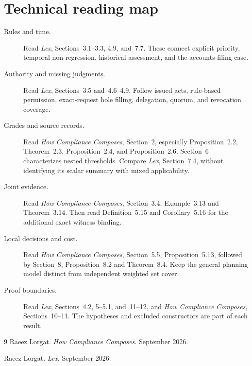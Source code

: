 \documentclass{momentum}
\begin{document}
\section{Technical reading map}

\begin{description}
\item[Rules and time.] Read \emph{Lex}, Sections~3.1--3.3, 4.9, and~7.7. These connect explicit priority, temporal non-regression, historical assessment, and the accounts-filing case.
\item[Authority and missing judgments.] Read \emph{Lex}, Sections~3.5 and~4.6--4.9. Follow issued acts, rule-based permission, exact-request hole filling, delegation, quorum, and revocation coverage.
\item[Grades and source records.] Read \emph{How Compliance Composes}, Section~2, especially Proposition~2.2, Theorem~2.3, Proposition~2.4, and Proposition~2.6. Section~6 characterizes nested thresholds. Compare \emph{Lex}, Section~7.4, without identifying its scalar summary with mixed applicability.
\item[Joint evidence.] Read \emph{How Compliance Composes}, Section~3.4, Example~3.13 and Theorem~3.14. Then read Definition~5.15 and Corollary~5.16 for the additional exact witness binding.
\item[Local decisions and cost.] Read \emph{How Compliance Composes}, Section~5.5, Proposition~5.13, followed by Section~8, Proposition~8.2 and Theorem~8.4. Keep the general planning model distinct from independent weighted set cover.
\item[Proof boundaries.] Read \emph{Lex}, Sections~4.2, 5--5.1, and~11--12, and \emph{How Compliance Composes}, Sections~10--11. The hypotheses and excluded constructors are part of each result.
\end{description}

\begin{thebibliography}{9}
Raeez Lorgat.
\emph{How Compliance Composes}.
September 2026.

Raeez Lorgat.
\emph{Lex}.
September 2026.
\end{thebibliography}
\end{document}
